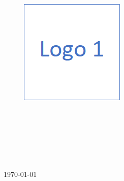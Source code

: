 
\begin{titlepage}
	
	\begin{center}
		
		\begin{figure}[!ht]
			
			\centering
			\includegraphics[width=5cm]{figuras/logo_1.png}
			
		\end{figure}
	
			\Huge{\collegename}\\
			\large{\institutename}\\
			\large{\course}\\
			\vspace{3cm}
	        \textbf{\LARGE{\reporttitle}}\\
			\vspace{3cm}
			\authorname \\
			\vspace{\fill}
			\city \\
			\today
			
	\end{center}

\end{titlepage}


